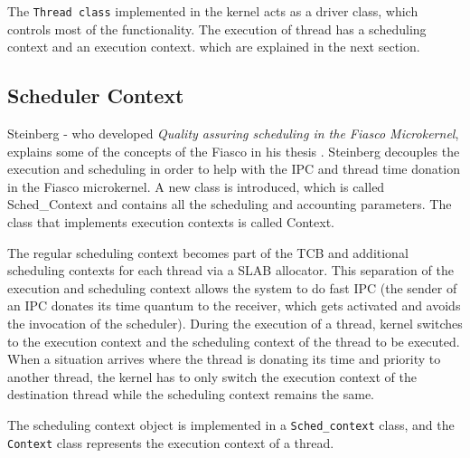 The \texttt{Thread class} implemented in the kernel acts as a driver class, which controls most of the functionality. The execution of thread has a scheduling context and an execution context. which are explained in the next section.


\subsection{Scheduler Context}\label{Foundations:sc}
Steinberg - who developed \textit{Quality assuring scheduling in the Fiasco Microkernel}, explains some of the concepts of the Fiasco in his thesis \cite{stein}. Steinberg decouples the execution and scheduling in order to help with the IPC and thread time donation in the Fiasco microkernel. A new class is introduced, which is called Sched\_Context and contains all the scheduling and accounting parameters. The class that implements execution contexts is called Context.

The regular scheduling context becomes part of the TCB and additional scheduling contexts for each thread via a SLAB allocator. This separation of the execution and scheduling context allows the system to do fast IPC (the sender of an IPC donates its time quantum to the receiver, which gets activated and avoids the invocation of the scheduler). During the execution of a thread, kernel switches to the execution context and the scheduling context of the thread to be executed. When a situation arrives where the thread is donating its time and priority to another thread, the kernel has to only switch the execution context of the destination thread while the scheduling context remains the same.

The scheduling context object is implemented in a \texttt{Sched\_context} class, and the \texttt{Context} class represents the execution context of a thread.

